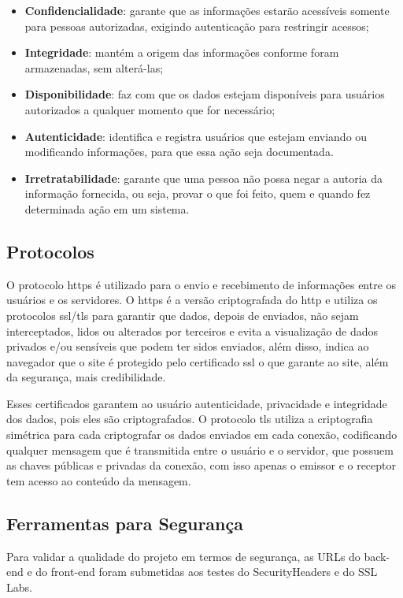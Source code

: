 \begin{itemize}
\item \textbf{Confidencialidade}: garante que as informações estarão acessíveis somente para pessoas autorizadas, exigindo autenticação para restringir acessos;
\item \textbf{Integridade}: mantém a origem das informações conforme foram armazenadas, sem alterá-las;
\item \textbf{Disponibilidade}: faz com que os dados estejam disponíveis para usuários autorizados a qualquer momento que for necessário;
\item \textbf{Autenticidade}: identifica e registra usuários que estejam enviando ou modificando informações, para que essa ação seja documentada.
\item \textbf{Irretratabilidade}: garante que uma pessoa não possa negar a autoria da informação fornecida, ou seja, provar o que foi feito, quem e quando fez determinada ação em um sistema. 
\end{itemize}

\subsection {Protocolos}
O protocolo \ac{https} é utilizado para o envio e recebimento de informações entre os usuários e os servidores. O \ac{https} é a versão criptografada do \ac{http} e utiliza os protocolos \ac{ssl}/\ac{tls} para garantir que dados, depois de enviados, não sejam interceptados, lidos ou alterados por terceiros e evita a visualização de dados privados e/ou sensíveis que podem ter sidos enviados, além disso, indica ao navegador que o site é protegido pelo certificado \ac{ssl} o que garante ao site, além da segurança, mais credibilidade. 

Esses certificados garantem ao usuário autenticidade, privacidade e integridade dos dados, pois eles são criptografados. O protocolo \ac{tls} utiliza a criptografia simétrica para cada criptografar os dados enviados em cada conexão, codificando qualquer mensagem que é transmitida entre o usuário e o servidor, que possuem as chaves públicas e privadas da conexão, com isso apenas o emissor e o receptor tem acesso ao conteúdo da mensagem.

\subsection {Ferramentas para Segurança}
Para validar a qualidade do projeto em termos de segurança, as URLs do \gls{back-end} e do \gls{front-end} foram submetidas aos testes do SecurityHeaders e do SSL Labs. 

